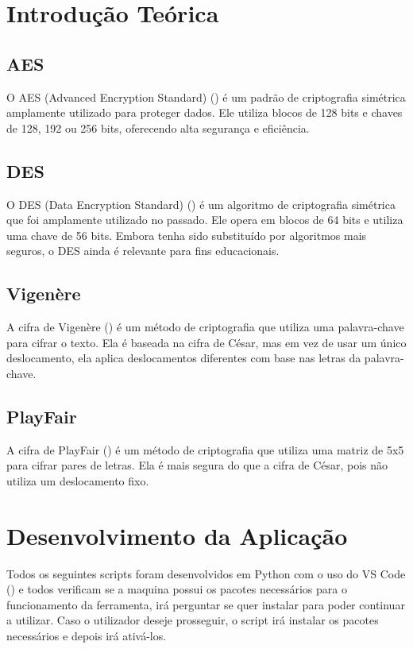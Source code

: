 \documentclass[a4paper]{article}
\begin{document}
\newpage
\section{Introdução Teórica}\label{theory}
\subsection{AES}
O AES (Advanced Encryption Standard) (\cite{aes}) é um padrão de criptografia simétrica amplamente utilizado para proteger dados.
Ele utiliza blocos de 128 bits e chaves de 128, 192 ou 256 bits, oferecendo alta segurança e eficiência.

\subsection{DES}
O DES (Data Encryption Standard) (\cite{des}) é um algoritmo de criptografia simétrica que foi amplamente utilizado no passado.
Ele opera em blocos de 64 bits e utiliza uma chave de 56 bits.
Embora tenha sido substituído por algoritmos mais seguros, o DES ainda é relevante para fins educacionais.

\subsection{Vigenère}
A cifra de Vigenère (\cite{vigenere}) é um método de criptografia que utiliza uma palavra-chave para cifrar o texto.
Ela é baseada na cifra de César, mas em vez de usar um único deslocamento, ela aplica deslocamentos diferentes com
base nas letras da palavra-chave.

\subsection{PlayFair}
A cifra de PlayFair (\cite{playfair}) é um método de criptografia que utiliza uma matriz de 5x5 para cifrar pares de letras.
Ela é mais segura do que a cifra de César, pois não utiliza um deslocamento fixo.

\newpage
\section{Desenvolvimento da Aplicação}\label{dev}
Todos os seguintes scripts foram desenvolvidos em Python com o uso do VS Code (\cite{vscode}) e todos verificam se a maquina possui os pacotes necessários
para o funcionamento da ferramenta, irá perguntar se quer instalar para poder continuar a utilizar. Caso
o utilizador deseje prosseguir, o script irá instalar os pacotes necessários e depois irá ativá-los.
\end{document}
